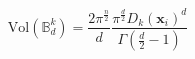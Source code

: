 \begin{equation}
\label{eq:vol_sphere}
\text{Vol}(\mathbb{B}_d^k) = \frac{2\pi^{\frac{n}{2}}}{d}\frac{\pi^{\frac{d}{2}}D_{k}(\bm{x}_i)^d}{\Gamma\left(\frac{d}{2} - 1\right)}
\end{equation}
